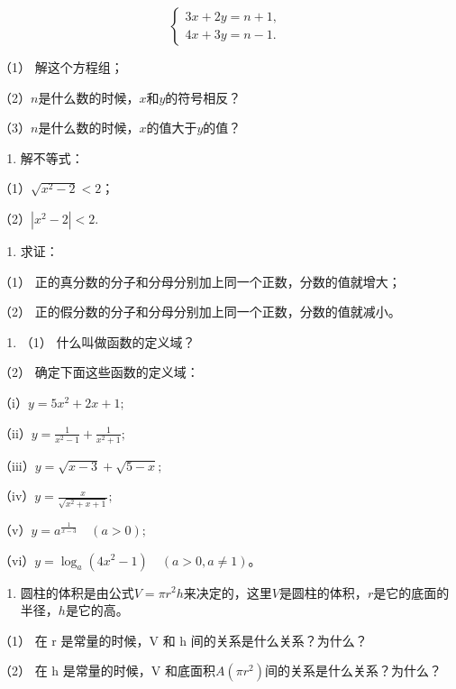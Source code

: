 \[
\left\{ \begin{array}{l} 3 x + 2 y = n + 1, \\ 4 x + 3 y = n - 1. \end{array} \right.
\]

（1） 解这个方程组；

（2）\(n\)是什么数的时候，\(x\)和\(y\)的符号相反？

（3）\(n\)是什么数的时候，\(x\)的值大于\(y\)的值？

\begin{enumerate}[start=8]
\item
  解不等式：
\end{enumerate}

（1）\(\sqrt{x^2 - 2} < 2\)；

（2）\(|x^{2}-2|<2.\)

\begin{enumerate}[start=9]
\item
  求证：
\end{enumerate}

（1） 正的真分数的分子和分母分别加上同一个正数，分数的值就增大；

（2） 正的假分数的分子和分母分别加上同一个正数，分数的值就减小。

\begin{enumerate}[start=10]
\item
  （1） 什么叫做函数的定义域？
\end{enumerate}

（2） 确定下面这些函数的定义域：

（i）\(y=5x^{2}+2x+1;\)

（ii）\(y = \frac{1}{x^2 - 1} + \frac{1}{x^2 + 1};\)

（iii）\(y = \sqrt{x - 3} + \sqrt{5 - x};\)

（iv）\(y = \frac{x}{\sqrt{x^2 + x + 1}};\)

（v）\(y = a^{\frac{1}{x - 3}} \quad (a > 0);\)

（vi）\(y = \log_a(4x^2 - 1) \quad (a > 0, a \neq 1)\)。

\begin{enumerate}[start=11]
\item
  圆柱的体积是由公式\(V = \pi r^2 h\)来决定的，这里\(V\)是圆柱的体积，\(r\)是它的底面的半径，\(h\)是它的高。
\end{enumerate}

（1） 在 r 是常量的时候，V 和 h 间的关系是什么关系？为什么？

（2） 在 h 是常量的时候，V
和底面积\(A(\pi r^{2})\)间的关系是什么关系？为什么？

